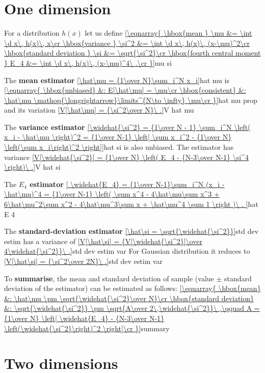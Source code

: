 

\parindent=5mm

\SetFontSizesX

\section{One dimension}

For a distribution $h(x)$ let us define
\eqref{\eqnarray{
\hbox{mean } \mu &= \int \d x\, h(x)\, x\cr
\hbox{variance } \si^2 &= \int \d x\, h(x)\, (x-\mu)^2\cr
\hbox{standard deviation } \si &= \sqrt{\si^2}\cr
\hbox{fourth central moment } E_4 &= \int \d x\, h(x)\, (x-\mu)^4\ .\cr
}}{mu si}

The {\bf mean estimator}
\eqref{\hat\mu = {1\over N}\sum_i^N x_i}{hat mu}
is
\eqref{\eqnarray{
\hbox{unbiased} &: E[\hat\mu] = \mu\cr
\hbox{consistent} &: \hat\mu \mathop{\longrightarrow}\limits^{N\to \infty} \mu\cr
}}{hat mu prop}
and its variation
\eqref{V[\hat\mu] = {\si^2\over N}\ .}{V hat mu}

The {\bf variance estimator}
\eqref{\widehat{\si^2} = {1\over N - 1} \sum_i^N \left( x_i - \hat\mu \right)^2 = {1\over N-1} \left[ \sum x_i^2 - {1\over N} \left(\sum x_i\right)^2 \right]}{hat si}
is also unbiased. The estimator has variance
\eqref{V[\widehat{\si^2}] = {1\over N} \left( E_4 - {N-3\over N-1} \si^4 \right)\ .}{V hat si}

The {\bf $E_4$ estimator}
\eqref{
	\widehat{E_4} = {1\over N-1}\sum_i^N (x_i - \hat\mu)^4 = 
	{1\over N-1} \left( \sum x^4 - 4\hat\mu\sum x^3 + 6\hat\mu^2\sum x^2 - 4\hat\mu^3\sum x + \hat\mu^4 \sum 1 \right )\ .
}{hat E 4}

The {\bf standard-deviation estimator}
\eqref{\hat\si = \sqrt{\widehat{\si^2}}}{std dev estim}
has a variance of
\eqref{V[\hat\si] = {V[\widehat{\si^2}]\over 4\widehat{\si^2}}\ .}{std dev estim var}
For Gaussian distribution it reduces to
\eqref{V[\hat\si] = {\si^2\over 2N}\ .}{std dev estim var}

To {\bf summarise}, the mean and standard deviation of sample (value $\pm$ standard deviation of the estimator) can be estimated as follows:
\eqref{\eqnarray{
\hbox{mean} &: \hat\mu \pm \sqrt{\widehat{\si^2}\over N}\cr
\hbox{standard deviation} &: \sqrt{\widehat{\si^2}} \pm \sqrt{A\over 2\,\widehat{\si^2}}\ ,\qquad A = {1\over N} \left[ \widehat{E_4} - {N-3\over N-1} \left(\widehat{\si^2}\right)^2 \right]\cr
}}{summary}


\vfil
\eject


\section{Two dimensions}

